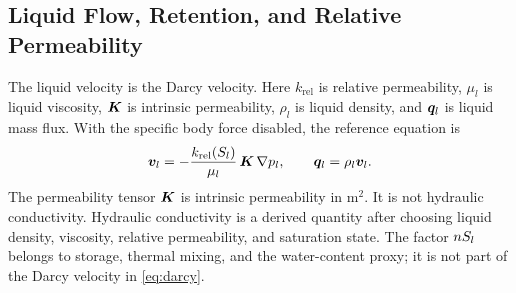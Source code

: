 \subsection{Liquid Flow, Retention, and Relative Permeability}
\label{sec:darcy-retention}

The liquid velocity is the Darcy velocity.  Here \(k_{\mathrm{rel}}\) is relative
permeability, \(\mu_l\) is liquid viscosity, \(\bm{K}\) is intrinsic permeability,
\(\rho_l\) is liquid density, and \(\bm{q}_{l}\) is liquid mass flux.  With the specific
body force disabled, the reference equation is
\begin{equation}
  \bm{v}_{l}
  =
  -\frac{k_{\mathrm{rel}}(S_l)}{\mu_l}\,\bm{K}\,\nabla p_l ,
  \qquad
  \bm{q}_{l}=\rho_l\bm{v}_{l} .
  \label{eq:darcy}
\end{equation}
The permeability tensor \(\bm{K}\) is intrinsic permeability in \(\mathrm{m^2}\).  It
is not hydraulic conductivity.  Hydraulic conductivity is a derived quantity after
choosing liquid density, viscosity, relative permeability, and saturation state.  The
factor \(nS_l\) belongs to storage, thermal mixing, and the water-content proxy;
it is not part of the Darcy velocity in \eqref{eq:darcy}.

